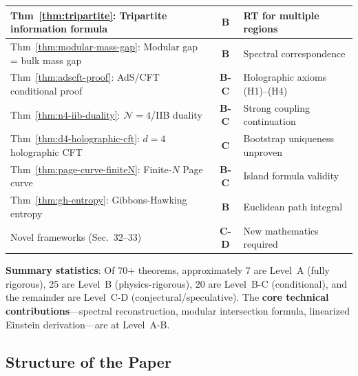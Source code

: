 \documentclass[12pt,a4paper]{article}
\begin{document}
\begin{center}
\begin{longtable}{|p{5.5cm}|c|p{6cm}|}
\hline
Thm~\ref{thm:tripartite}: Tripartite information formula & \textbf{B} & RT for multiple regions \\
\hline
Thm~\ref{thm:modular-mass-gap}: Modular gap = bulk mass gap & \textbf{B} & Spectral correspondence \\
\hline
Thm~\ref{thm:adscft-proof}: AdS/CFT conditional proof & \textbf{B-C} & Holographic axioms (H1)--(H4) \\
\hline
Thm~\ref{thm:n4-iib-duality}: $\mathcal{N}=4$/IIB duality & \textbf{B-C} & Strong coupling continuation \\
\hline
Thm~\ref{thm:d4-holographic-cft}: $d=4$ holographic CFT & \textbf{C} & Bootstrap uniqueness unproven \\
\hline
Thm~\ref{thm:page-curve-finiteN}: Finite-$N$ Page curve & \textbf{B-C} & Island formula validity \\
\hline
Thm~\ref{thm:gh-entropy}: Gibbons-Hawking entropy & \textbf{B} & Euclidean path integral \\
\hline
Novel frameworks (Sec.~32--33) & \textbf{C-D} & New mathematics required \\
\hline
\end{longtable}
\end{center}

\noindent\textbf{Summary statistics}: Of 70+ theorems, approximately 7 are Level~A (fully rigorous), 25 are Level~B (physics-rigorous), 20 are Level~B-C (conditional), and the remainder are Level~C-D (conjectural/speculative). The \textbf{core technical contributions}---spectral reconstruction, modular intersection formula, linearized Einstein derivation---are at Level~A-B.

\subsection{Structure of the Paper}
\end{document}
